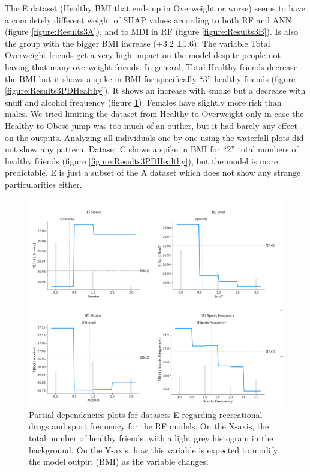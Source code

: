 The E dataset (Healthy BMI that ends up in Overweight or worse) seems to have a completely different weight of SHAP values according to both RF and ANN (figure \ref{figure:Results3A}), and to MDI in RF (figure \ref{figure:Results3B}). Is also the group with the bigger BMI increase (+3.2 ±1.6). The variable Total Overweight friends get a very high impact on the model despite people not having that many overweight friends. In general, Total Healthy friends decrease the BMI but it shows a spike in BMI for specifically “3” healthy friends (figure \ref{figure:Results3PDHealthy}).  It shows an increase with smoke but a decrease with snuff and alcohol frequency (figure \ref{figure:Results3EWeird}). Females have slightly more risk than males. We tried limiting the dataset from Healthy to Overweight only in case the Healthy to Obese jump was too much of an outlier, but it had barely any effect on the outputs. Analyzing all individuals one by one using the waterfall plots did not show any pattern. Dataset C shows a spike in BMI for “2” total numbers of healthy friends (figure \ref{figure:Results3PDHealthy}), but the model is more predictable. E is just a subset of the A dataset which does not show any strange particularities either. 

    \begin{figure}[ht]
        \centering
            \includegraphics[width=0.7\linewidth]{figures/Results/ResultThree/PDECrap.png } 
        \caption{Partial dependencies plots for datasets E regarding recreational drugs and sport frequency for the RF models. On the X-axis, the total number of healthy friends, with a light grey histogram in the background. On the Y-axis, how this variable is expected to modify the model output (BMI) as the variable changes. }
        \label{figure:Results3EWeird}
    \end{figure}    

